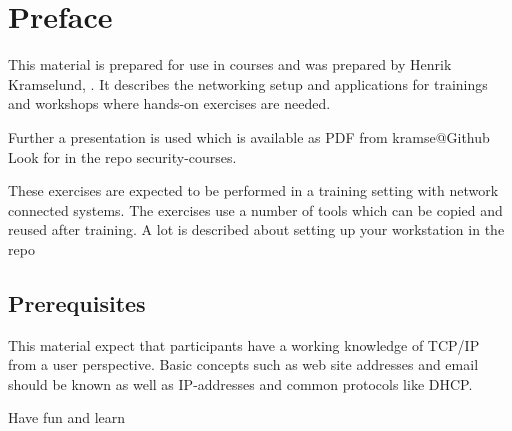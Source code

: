 \documentclass[a4paper,11pt,notitlepage]{report}
\begin{document}
{}

\newcommand{\emne}[1]{Intro to IT-security Systems Security workshop}
\newcommand{\kursus}[1]{Computer Systems Security workshop}
\newcommand{\kursusnavn}[1]{Computer Systems Security workshop\\ exercises}


\setcounter{tocdepth}{0}


\normal

{\color{titlecolor}\tableofcontents}

\normal
\pagestyle{fancyplain}
\chapter*{\color{titlecolor}Preface}

This material is prepared for use in courses and was prepared by
Henrik Kramselund,  .
It describes the networking setup and
applications for trainings and workshops where hands-on exercises are needed.

\vskip 1cm
Further a presentation is used which is available as PDF from kramse@Github\\
Look for \jobname in the repo security-courses.

These exercises are expected to be performed in a training setting with network connected systems. The exercises use a number of tools which can be copied and reused after training. A lot is described about setting up your workstation in the repo



\section*{\color{titlecolor}Prerequisites}

This material expect that participants have a working knowledge of
TCP/IP from a user perspective. Basic concepts such as web site addresses and email should be known as well as IP-addresses and common protocols like DHCP.

\vskip 1cm
Have fun and learn
\eject

\rhead{\fancyplain{}{\bf \chaptername\ \thechapter}}
\end{document}

